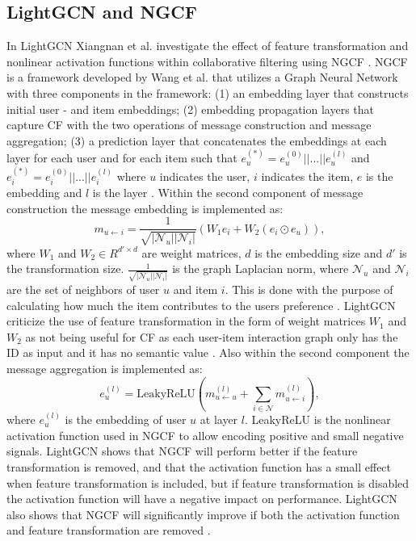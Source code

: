 \subsection{LightGCN and NGCF}\label{subsec:lightgcn-ngcf}
In LightGCN Xiangnan et al. investigate the effect of feature transformation and nonlinear activation functions within collaborative filtering using NGCF \cite{lightgcn}.
NGCF is a framework developed by Wang et al. \cite{NGCF_2019} that utilizes a Graph Neural Network with three components in the framework: (1) an embedding layer that constructs initial user - and item embeddings; (2) embedding propagation layers that capture CF with the two operations of message construction and message aggregation; (3) a prediction layer that concatenates the embeddings at each layer for each user and for each item such that $e_{u}^{(*)} = e_{u}^{(0)}||...||e_{u}^{(l)}$ and $e_{i}^{(*)} = e_{i}^{(0)}||...||e_{i}^{(l)}$ where $u$ indicates the user, $i$ indicates the item, $e$ is the embedding and $l$ is the layer \cite{NGCF_2019}.
Within the second component of message construction the message embedding is implemented as:
\begin{equation}
    m_{u \leftarrow i} = \frac{1}{\sqrt{|\mathcal{N}_u||\mathcal{N}_i|}}(W_1e_i + W_2(e_i \odot e_u)),
    \label{eq:message-construction}
\end{equation}
where $W_1$ and $W_2 \in R^{d' \times d}$ are weight matrices, $d$ is the embedding size and $d'$ is the transformation size.
$\frac{1}{\sqrt{|\mathcal{N}_u||\mathcal{N}_i|}}$ is the graph Laplacian norm, where $\mathcal{N}_u$ and $\mathcal{N}_i$ are the set of neighbors of user $u$ and item $i$.
This is done with the purpose of calculating how much the item contributes to the users preference \cite{NGCF_2019}.
LightGCN criticize the use of feature transformation in the form of weight matrices $W_1$ and $W_2$ as not being useful for CF as each user-item interaction graph only has the ID as input and it has no semantic value \cite{lightgcn}.
Also within the second component the message aggregation is implemented as:
\begin{equation}
    e_{u}^{(l)} = \mbox{LeakyReLU}(m^{(l)}_{u \leftarrow u} + \sum^{}_{i \in \mathcal{N}} m^{(l)}_{u \leftarrow i}),
\end{equation}
where $e_{u}^{(l)}$ is the embedding of user $u$ at layer $l$.
LeakyReLU is the nonlinear activation function used in NGCF to allow encoding positive and small negative signals.
LightGCN shows that NGCF will perform better if the feature transformation is removed, and that the activation function has a small effect when feature transformation is included, but if feature transformation is disabled the activation function will have a negative impact on performance.
LightGCN also shows that NGCF will significantly improve if both the activation function and feature transformation are removed \cite{lightgcn}.
